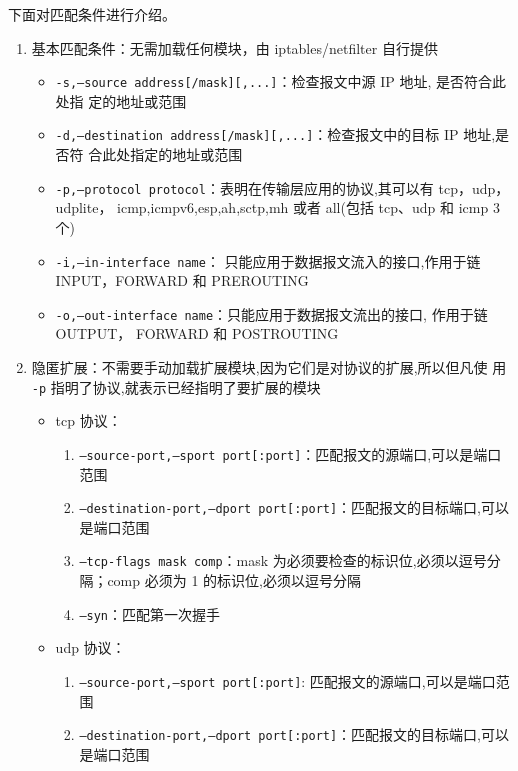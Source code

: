 下面对匹配条件进行介绍。
\begin{enumerate}
  \item  基本匹配条件：无需加载任何模块，由 iptables/netfilter 自行提供
    \begin{itemize}
      \item \texttt{-s,--source address[/mask][,...]}：检查报文中源 IP 地址, 是否符合此处指
        定的地址或范围
      \item \texttt{-d,--destination address[/mask][,...]}：检查报文中的目标 IP 地址,是否符
        合此处指定的地址或范围
      \item \texttt{-p,--protocol protocol}：表明在传输层应用的协议,其可以有 tcp，udp，udplite，
        icmp,icmpv6,esp,ah,sctp,mh 或者 all(包括 tcp、udp 和 icmp 3 个)
      \item \texttt{-i,--in-interface name}：
        只能应用于数据报文流入的接口,作用于链 INPUT，FORWARD 和 PREROUTING
      \item \texttt{-o,--out-interface name}：只能应用于数据报文流出的接口, 作用于链 OUTPUT，
        FORWARD 和 POSTROUTING
    \end{itemize}
  \item  隐匿扩展：不需要手动加载扩展模块,因为它们是对协议的扩展,所以但凡使
    用 \texttt{-p} 指明了协议,就表示已经指明了要扩展的模块
    \begin{itemize}
      \item tcp 协议：
        \begin{enumerate}
          \item \texttt{--source-port,--sport port[:port]}：匹配报文的源端口,可以是端口范围
          \item \texttt{--destination-port,--dport port[:port]}：匹配报文的目标端口,可以是端口范围
          \item \texttt{--tcp-flags mask comp}：mask 为必须要检查的标识位,必须以逗号分隔；comp
            必须为 1 的标识位,必须以逗号分隔
          \item \texttt{--syn}：匹配第一次握手
        \end{enumerate}
      \item udp 协议：
        \begin{enumerate}
          \item \texttt{--source-port,--sport port[:port]}: 匹配报文的源端口,可以是端口范围
          \item \texttt{--destination-port,--dport port[:port]}：匹配报文的目标端口,可以是端口范围

\end{enumerate}
\end{itemize}
\end{enumerate}
